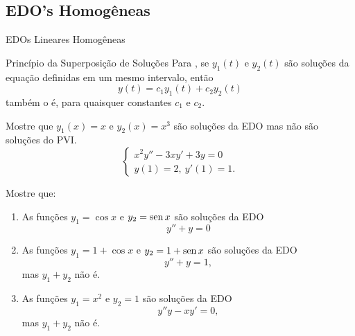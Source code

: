 \subsection*{EDO's Homogêneas}

\begin{frame}{EDOs Lineares Homogêneas}

\begin{block}{Princípio da Superposição de Soluções}
Para , se $y_1(t)$ e $y_2(t)$ são soluções da equação definidas em um mesmo intervalo, então $$y(t)=c_1y_1(t)+c_2y_2(t)$$
também o é, para quaisquer constantes $c_1$ e $c_2$. 
\end{block}


\begin{exe}Mostre que $y_1(x)=x$ e $y_2(x)=x^3$ são soluções da EDO mas não são soluções do PVI.
\[\begin{cases}
 x^2y''-3xy'+3y=0\\
y(1)= 2,\  y'(1)=1.
\end{cases}
\]


\end{exe}


\end{frame}

\begin{frame}

\begin{casa}
Mostre que:

\begin{enumerate}
\item As funções  $y_1=\cos x$ e $y_2=\operatorname{sen} x$ são soluções da EDO
$$y''+y=0$$

\item As funções $y_1=1+\cos x$ e $y_2=1+\operatorname{sen} x$ são soluções da EDO
$$y''+y=1,$$
mas $y_1+y_2$ não é. 

\item As funções $y_1=x^2$ e $y_2=1$ são soluções da EDO
$$y''y-xy'=0,$$
mas $y_1+y_2$ não é.
\end{enumerate}
\end{casa}
\end{frame}


